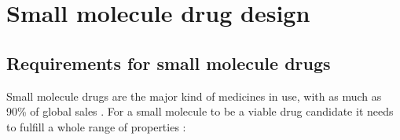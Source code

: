 
\section{Small molecule drug design}
\subsection{Requirements for small molecule drugs}
Small molecule drugs are the major kind of medicines in use, with as much as
90\% of global sales \citep{makurvetBiologicsVsSmall2021}.
For a small molecule to be a viable drug candidate it needs to fulfill a whole range 
of properties \citep{todo}:

